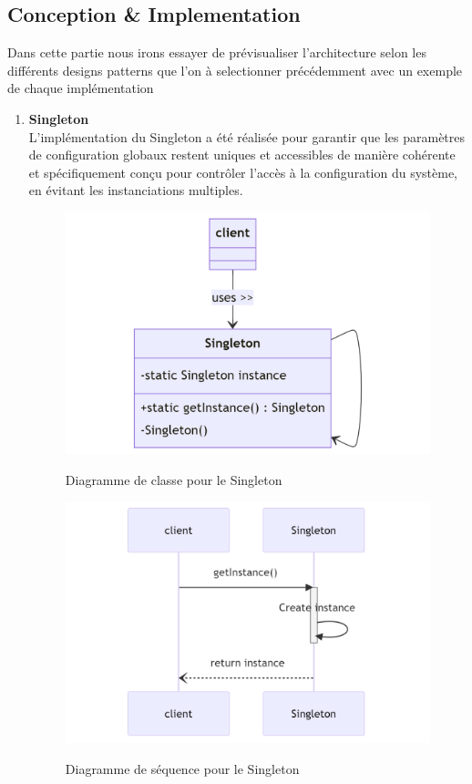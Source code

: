 \documentclass[a4paper,11pt]{article}
\begin{document}
\subsection{Conception & Implementation}

Dans cette partie nous irons essayer de prévisualiser l'architecture selon les différents designs patterns que l'on à selectionner précédemment avec un exemple de chaque implémentation
\\
\begin{enumerate}
    \item \textbf{Singleton} \\
    L'implémentation du Singleton a été réalisée pour garantir que les paramètres de configuration globaux restent uniques et accessibles de manière cohérente et spécifiquement conçu pour contrôler l'accès à la configuration du système, en évitant les instanciations multiples.
    \begin{figure} [!ht]
        \centering
        \caption{Diagramme de classe pour le Singleton}
        \includegraphics[scale=0.2]{classe_singleton.png}
        \label{fig:SingletonClassDiagram}
    \end{figure}
\hfill
    \begin{figure} [!ht]
        \centering
        \caption{Diagramme de séquence pour le Singleton}
        \includegraphics[scale=0.2]{sequence_singleton.png}
        \label{fig:SingletonSequenceDiagram}
    \end{figure}


\end{enumerate}
\end{document}
